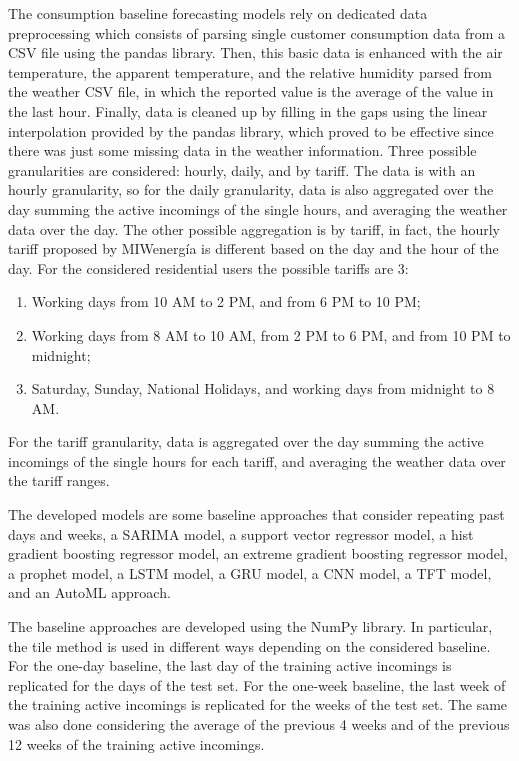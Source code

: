 The consumption baseline forecasting models rely on dedicated data preprocessing which consists of parsing single customer consumption data from a CSV file using the pandas library.
Then, this basic data is enhanced with the air temperature, the apparent temperature, and the relative humidity parsed from the weather CSV file, in which the reported value is the average of the value in the last hour.
Finally, data is cleaned up by filling in the gaps using the linear interpolation provided by the pandas library, which proved to be effective since there was just some missing data in the weather information.
Three possible granularities are considered: hourly, daily, and by tariff.
The data is with an hourly granularity, so for the daily granularity, data is also aggregated over the day summing the active incomings of the single hours, and averaging the weather data over the day.
The other possible aggregation is by tariff, in fact, the hourly tariff proposed by MIWenergía is different based on the day and the hour of the day.
For the considered residential users the possible tariffs are 3:
\begin{enumerate}
  \item Working days from 10 AM to 2 PM, and from 6 PM to 10 PM;
  \item Working days from 8 AM to 10 AM, from 2 PM to 6 PM, and from 10 PM to midnight;
  \item Saturday, Sunday, National Holidays, and working days from midnight to 8 AM.
\end{enumerate}
For the tariff granularity, data is aggregated over the day summing the active incomings of the single hours for each tariff, and averaging the weather data over the tariff ranges.

The developed models are some baseline approaches that consider repeating past days and weeks, a SARIMA model, a support vector regressor model, a hist gradient boosting regressor model, an extreme gradient boosting regressor model, a prophet model, a LSTM model, a GRU model, a CNN model, a TFT model, and an AutoML approach.

The baseline approaches are developed using the NumPy library.
In particular, the tile method is used in different ways depending on the considered baseline.
For the one-day baseline, the last day of the training active incomings is replicated for the days of the test set.
For the one-week baseline, the last week of the training active incomings is replicated for the weeks of the test set.
The same was also done considering the average of the previous 4 weeks and of the previous 12 weeks of the training active incomings.

